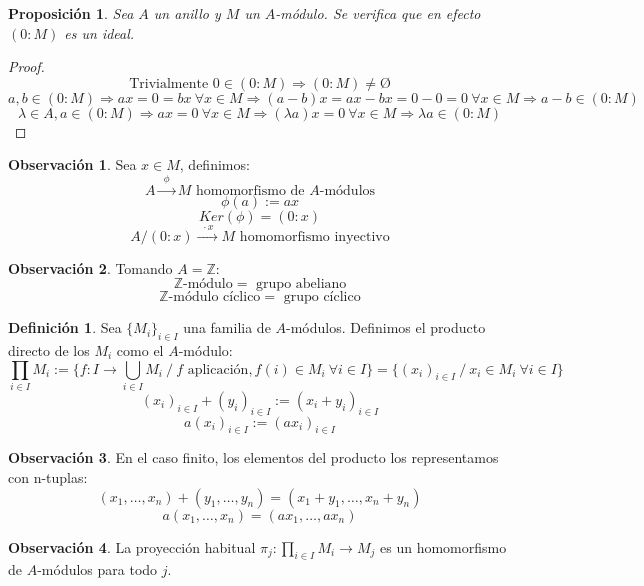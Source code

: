 \documentclass{article}
\theoremstyle{theorem-style}  %
\newtheorem{proposition}[theorem]{Proposición}
\theoremstyle{definition}
\newtheorem{definition}{Definición}[section]
\newtheorem*{observation}{Observación} %
\theoremstyle{example-style}
\begin{document}
	\begin{proposition}
		Sea $A$ un anillo y $M$ un $A$-módulo. Se verifica que en efecto $(0:M)$ es un ideal.
	\end{proposition}

	\begin{proof}
		\[ \text{Trivialmente } 0 \in (0:M) \Rightarrow (0:M) \neq \text{\O}\]
		\[ a,b \in (0:M) \Rightarrow ax=0=bx \ \forall x \in M \Rightarrow (a-b)x=ax-bx=0-0=0 \ \forall x \in M \Rightarrow a-b \in (0:M) \]
		\[ \lambda \in A, a \in (0:M) \Rightarrow ax=0 \ \forall x \in M \Rightarrow (\lambda a)x=0 \ \forall x \in M \Rightarrow \lambda a \in (0:M) \]
	\end{proof}

	\begin{observation}
		Sea $x \in M$, definimos:
		\[ A\xrightarrow{\ \ \phi \ \ } M \text{ homomorfismo de $A$-módulos}\]
		\[ \phi(a):=ax\]
		\[ Ker(\phi)=(0:x)\]
		\[A/(0:x)\xrightarrow{\ \ \cdot x\ \ }M \text{ homomorfismo inyectivo}\]
	\end{observation}

	\begin{observation}
		Tomando $A=\mathbb{Z}$:
		\[ \mathbb{Z}\text{-módulo}=\text{ grupo abeliano}\]
		\[ \mathbb{Z}\text{-módulo cíclico}=\text{ grupo cíclico}\]
	\end{observation}

	\begin{definition}
		Sea $\{M_i\}_{i\in I}$ una familia de $A$-módulos. Definimos el producto directo de los $M_i$ como el $A$-módulo:
		\[ \prod_{i\in I}M_i := \{f:I\rightarrow\bigcup_{i\in I}M_i \ / \ \text{$f$ aplicación}, f(i)\in M_i \ \forall i \in I\} = \{(x_i)_{i\in I} \ / \ x_i \in M_i \ \forall i \in I\}\]
		\[(x_i)_{i\in I} + (y_i)_{i\in I} := (x_i + y_i)_{i\in I}\]
		\[a(x_i)_{i\in I} := (ax_i)_{i\in I}\]
	\end{definition}

	\begin{observation}
		En el caso finito, los elementos del producto los representamos con n-tuplas:
		\[(x_1,\dots,x_n)+(y_1,\dots,y_n)=(x_1+y_1,\dots,x_n+y_n)\]
		\[a(x_1,\dots,x_n)=(ax_1,\dots,ax_n)\]
	\end{observation}

	\begin{observation}
		La proyección habitual $\pi_j:\prod_{i\in I}M_i \longrightarrow M_j$ es un homomorfismo de $A$-módulos para todo $j$.
	\end{observation}
\end{document}
